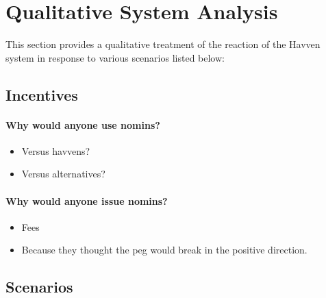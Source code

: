 \section{Qualitative System Analysis}

This section provides a qualitative treatment of the reaction of the Havven system in response to various scenarios listed below:


\subsection{Incentives}

\paragraph{Why would anyone use nomins?}
\begin{itemize}
	\item Versus havvens?
	\item Versus alternatives?
\end{itemize}

\paragraph{Why would anyone issue nomins?}
\begin{itemize}
	\item Fees
	\item Because they thought the peg would break in the positive direction.
\end{itemize}

\subsection{Scenarios}

